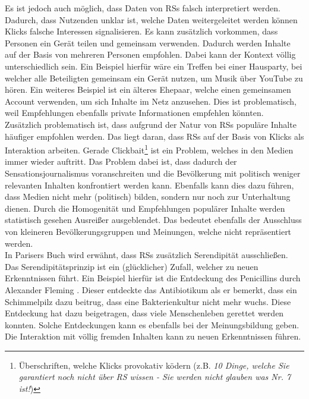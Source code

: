 Es ist jedoch auch möglich, dass Daten von \acp{RS} falsch interpretiert werden.
Dadurch, dass Nutzenden unklar ist, welche Daten weitergeleitet werden können Klicks falsche Interessen signalisieren.
Es kann zusätzlich vorkommen, dass Personen ein Gerät teilen und gemeinsam verwenden.
Dadurch werden Inhalte auf der Basis von mehreren Personen empfohlen.
Dabei kann der Kontext völlig unterschiedlich sein.
Ein Beispiel hierfür wäre ein Treffen bei einer Hausparty, bei welcher alle Beteiligten gemeinsam ein Gerät nutzen, um Musik über YouTube zu hören.
Ein weiteres Beispiel ist ein älteres Ehepaar, welche einen gemeinsamen Account verwenden, um sich Inhalte im Netz anzusehen.
Dies ist problematisch, weil Empfehlungen ebenfalls private Informationen empfehlen könnten. \\

Zusätzlich problematisch ist, dass aufgrund der Natur von \acp{RS} populäre Inhalte häufiger empfohlen werden.
Das liegt daran, dass \acp{RS} auf der Basis von Klicks als Interaktion arbeiten.
Gerade Clickbait\footnote{Überschriften, welche Klicks provokativ ködern (z.B. \textit{10 Dinge, welche Sie garantiert noch nicht über \ac{RS} wissen - Sie werden nicht glauben was Nr. 7 ist!})} ist ein Problem, welches in den Medien immer wieder auftritt.
Das Problem dabei ist, dass dadurch der Sensationsjournalismus voranschreiten und die Bevölkerung mit politisch weniger relevanten Inhalten konfrontiert werden kann.
Ebenfalls kann dies dazu führen, dass Medien nicht mehr (politisch) bilden, sondern nur noch zur Unterhaltung dienen.
Durch die Homogenität und Empfehlungen populärer Inhalte werden statistisch gesehen Ausreißer ausgeblendet.
Das bedeutet ebenfalls der Ausschluss von kleineren Bevölkerungsgruppen und Meinungen, welche nicht repräsentiert werden. \\

In Parisers Buch wird erwähnt, dass \acp{RS} zusätzlich Serendipität ausschließen.
Das Serendipitätsprinzip ist ein (glücklicher) Zufall, welcher zu neuen Erkenntnissen führt.
Ein Beispiel hierfür ist die Entdeckung des Penicillins durch Alexander Fleming \cite{penicilin}.
Dieser entdeckte das Antibiotikum als er bemerkt, dass ein Schimmelpilz dazu beitrug, dass eine Bakterienkultur nicht mehr wuchs.
Diese Entdeckung hat dazu beigetragen, dass viele Menschenleben gerettet werden konnten.
Solche Entdeckungen kann es ebenfalls bei der Meinungsbildung geben.
Die Interaktion mit völlig fremden Inhalten kann zu neuen Erkenntnissen führen. \\

